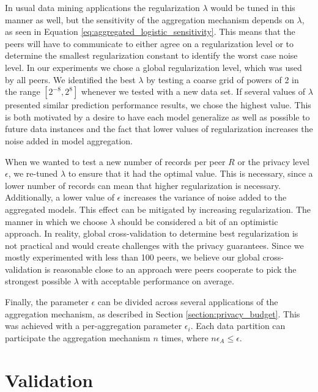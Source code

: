 In usual data mining applications the regularization $\lambda$ would be tuned in this manner as well, but the sensitivity of the aggregation mechanism depends on $\lambda$, as seen in Equation \ref{eq:aggregated_logistic_sensitivity}. This means that the peers will have to communicate to either agree on a regularization level or to determine the smallest regularization constant to identify the worst case noise level. In our experiments we chose a global regularization level, which was used by all peers. We identified the best $\lambda$ by testing a coarse grid of powers of 2 in the range $[2^{-8}, 2^{8}]$ whenever we tested with a new data set. If several values of $\lambda$ presented similar prediction performance results, we chose the highest value. This is both motivated by a desire to have each model generalize as well as possible to future data instances and the fact that lower values of regularization increases the noise added in model aggregation.

When we wanted to test a new number of records per peer $R$ or the privacy level $\epsilon$, we re-tuned $\lambda$ to ensure that it had the optimal value. This is necessary, since a lower number of records can mean that higher regularization is necessary. Additionally, a lower value of $\epsilon$ increases the variance of noise added to the aggregated models. This effect can be mitigated by increasing regularization.  The manner in which we choose $\lambda$ should be considered a bit of an optimistic approach. In reality, global cross-validation to determine best regularization is not practical and would create challenges with the privacy guarantees. Since we mostly experimented with less than 100 peers, we believe our global cross-validation is reasonable close to an approach were peers cooperate to pick the strongest possible $\lambda$ with acceptable performance on average.

Finally, the parameter $\epsilon$ can be divided across several applications of the aggregation mechanism, as described in Section \ref{section:privacy_budget}. This was achieved with a per-aggregation parameter $\epsilon_i$. Each data partition can participate the aggregation mechanism $n$ times, where $n\epsilon_A \leq \epsilon$.

\section{Validation}

